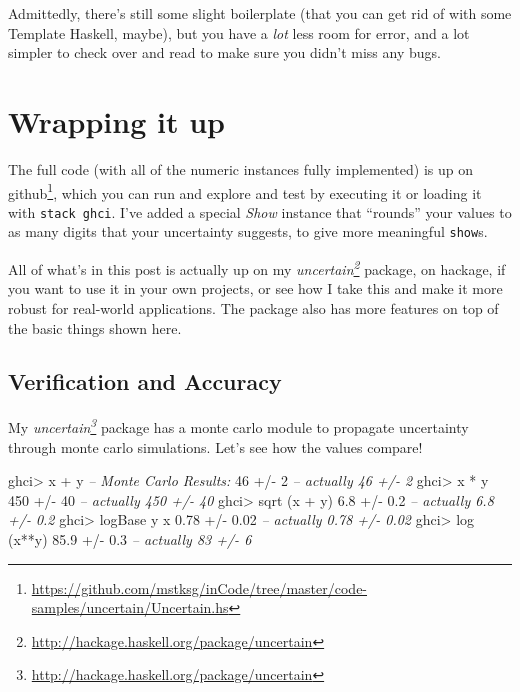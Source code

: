 \documentclass[]{article}
\newenvironment{Shaded}{}{}
\newcommand{\DecValTok}[1]{\textcolor[rgb]{0.25,0.63,0.44}{{#1}}}
\newcommand{\FloatTok}[1]{\textcolor[rgb]{0.25,0.63,0.44}{{#1}}}
\newcommand{\CommentTok}[1]{\textcolor[rgb]{0.38,0.63,0.69}{\textit{{#1}}}}
\newcommand{\FunctionTok}[1]{\textcolor[rgb]{0.02,0.16,0.49}{{#1}}}
\newcommand{\NormalTok}[1]{{#1}}
\renewcommand{\href}[2]{#2\footnote{\url{#1}}}
\begin{document}
Admittedly, there's still some slight boilerplate (that you can get rid
of with some Template Haskell, maybe), but you have a \emph{lot} less
room for error, and a lot simpler to check over and read to make sure
you didn't miss any bugs.

\section{Wrapping it up}\label{wrapping-it-up}

The full code (with all of the numeric instances fully implemented) is
up
\href{https://github.com/mstksg/inCode/tree/master/code-samples/uncertain/Uncertain.hs}{on
github}, which you can run and explore and test by executing it or
loading it with \texttt{stack\ ghci}. I've added a special \emph{Show}
instance that ``rounds'' your values to as many digits that your
uncertainty suggests, to give more meaningful \texttt{show}s.

All of what's in this post is actually up on my
\emph{\href{http://hackage.haskell.org/package/uncertain}{uncertain}}
package, on hackage, if you want to use it in your own projects, or see
how I take this and make it more robust for real-world applications. The
package also has more features on top of the basic things shown here.

\subsection{Verification and Accuracy}\label{verification-and-accuracy}

My \emph{\href{http://hackage.haskell.org/package/uncertain}{uncertain}}
package has a monte carlo module to propagate uncertainty through monte
carlo simulations. Let's see how the values compare!

\begin{Shaded}
\begin{Highlighting}[]
\NormalTok{ghci}\FunctionTok{>} \NormalTok{x }\FunctionTok{+} \NormalTok{y         }\CommentTok{-- Monte Carlo Results:}
\DecValTok{46} \FunctionTok{+/-} \DecValTok{2}            \CommentTok{-- actually 46 +/- 2}
\NormalTok{ghci}\FunctionTok{>} \NormalTok{x }\FunctionTok{*} \NormalTok{y}
\DecValTok{450} \FunctionTok{+/-} \DecValTok{40}          \CommentTok{-- actually 450 +/- 40}
\NormalTok{ghci}\FunctionTok{>} \NormalTok{sqrt (x }\FunctionTok{+} \NormalTok{y)}
\FloatTok{6.8} \FunctionTok{+/-} \FloatTok{0.2}         \CommentTok{-- actually 6.8 +/- 0.2}
\NormalTok{ghci}\FunctionTok{>} \NormalTok{logBase y x}
\FloatTok{0.78} \FunctionTok{+/-} \FloatTok{0.02}       \CommentTok{-- actually 0.78 +/- 0.02}
\NormalTok{ghci}\FunctionTok{>} \NormalTok{log (x}\FunctionTok{**}\NormalTok{y)}
\FloatTok{85.9} \FunctionTok{+/-} \FloatTok{0.3}        \CommentTok{-- actually 83 +/- 6}
\end{Highlighting}
\end{Shaded}
\end{document}
